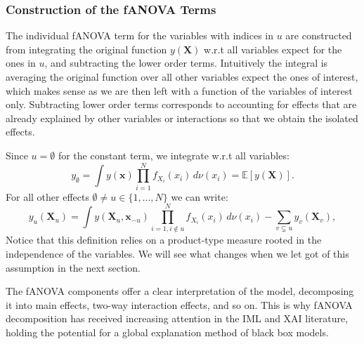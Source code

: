 
\subsubsection*{Construction of the fANOVA Terms}
The individual fANOVA term for the variables with indices in $u$ are constructed from integrating the original function $y(\boldsymbol{X})$ w.r.t all variables expect for the ones in $u$, and subtracting the lower order terms. Intuitively the integral is averaging the original function over all other variables expect the ones of interest, which makes sense as we are then left with a function of the variables of interest only. Subtracting lower order terms corresponds to accounting for effects that are already explained by other variables or interactions so that we obtain the isolated effects.\par
Since $u = \emptyset$ for the constant term, we integrate w.r.t all variables:
\begin{equation}
    y_{\emptyset} = \int y(\boldsymbol{x}) \prod_{i=1}^{N} f_{X_i}(x_i) \, d\nu (x_i) = \mathbb{E}[y(\boldsymbol{X})].
    \label{eq:intercept}
\end{equation}
For all other effects $\emptyset \neq u \in \{1, \dots, N\}$ we can write:
\begin{equation}
    y_u(\boldsymbol{X}_u) = \int y(\boldsymbol{X}_u, \boldsymbol{x}_{-u}) \prod_{i=1, i \notin u}^{N} f_{X_i}(x_i) \, d\nu (x_i)- \sum_{v \subsetneq u} y_v(\boldsymbol{X}_v),
    \label{eq:fanova_component}
\end{equation}
Notice that this definition relies on a product-type measure rooted in the independence of the variables. We will see what changes when we let got of this assumption in the next section.\par
The fANOVA components offer a clear interpretation of the model, decomposing it into main effects, two-way interaction effects, and so on. This is why fANOVA decomposition has received increasing attention in the IML and XAI literature, holding the potential for a global explanation method of black box models.\par

